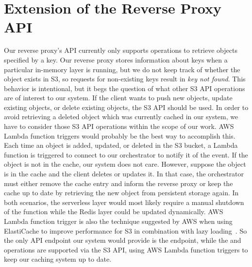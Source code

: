 \section{Extension of the Reverse Proxy API}
\label{sec:api_extension}

Our reverse proxy's API currently only supports  operations to retrieve objects specified by a key. Our reverse proxy stores information about keys when a particular in-memory layer is running, but we do not keep track of whether the object exists in S3, so requests for non-existing keys result in \emph{key not found}. This behavior is intentional, but it begs the question of what other S3 API operations are of interest to our system. If the client wants to push new objects, update existing objects, or delete existing objects, the S3 API should be used. In order to avoid retrieving a deleted object which was currently cached in our system, we have to consider those S3 API operations within the scope of our work. AWS Lambda function triggers would probably be the best way to accomplish this. Each time an object is added, updated, or deleted in the S3 bucket, a Lambda function is triggered to connect to our orchestrator to notify it of the event. If the object is not in the cache, our system does not care. However, suppose the object is in the cache and the client deletes or updates it. In that case, the orchestrator must either remove the cache entry and inform the reverse proxy or keep the cache up to date by retrieving the new object from persistent storage again. In both scenarios, the serverless layer would most likely require a manual shutdown of the function while the Redis layer could be updated dynamically. AWS Lambda function trigger is also the technique suggested by AWS when using ElastiCache to improve performance for S3 in combination with lazy loading~\cite{noauthor_turbocharge_2019}. So the only API endpoint our system would provide is the  endpoint, while the  and  operations are supported via the S3 API, using AWS Lambda function triggers to keep our caching system up to date.

